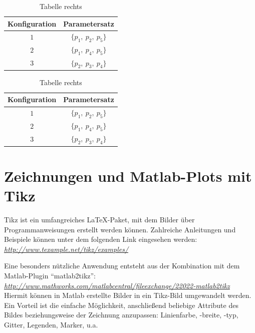 \begin{table}[tb]
\caption{Hauptbeschriftung}
\centering
	\begin{subtable}[t]{.5\textwidth}
	\centering
			\caption{Tabelle links}
			\begin{tabular}{cc}
				\toprule
				Konfiguration & Parametersatz \\
				\midrule
				$1$ & $\{p_{1}, \: p_{2}, \: p_{5}\}$ \\
				$2$ & $\{p_{1}, \: p_{4}, \: p_{5}\}$ \\
				$3$ & $\{p_{2}, \: p_{3}, \: p_{4}\}$ \\
				\bottomrule
			\end{tabular}
			\label{tab:parameter_tabelle1}
	\end{subtable}%
	\begin{subtable}[t]{.5\textwidth}
			\centering
			\caption{Tabelle rechts}
			\begin{tabular}{cc}
				\toprule
				Konfiguration & Parametersatz \\
				\midrule
				$1$ & $\{p_{1}, \: p_{2}, \: p_{5}\}$ \\
				$2$ & $\{p_{1}, \: p_{4}, \: p_{5}\}$ \\
				$3$ & $\{p_{2}, \: p_{3}, \: p_{4}\}$ \\
				\bottomrule
			\end{tabular}
			\label{tab:parameter_tabelle2}
	\end{subtable}
	\label{tab:parameter_tabellen}
\end{table}




%
%
%

\section{Zeichnungen und Matlab-Plots mit Tikz}
\label{sec:tikz}

Tikz ist ein umfangreiches \LaTeX-Paket, mit dem Bilder über Programmanweisungen erstellt werden können.
Zahlreiche Anleitungen und Beispiele können unter dem folgenden Link eingesehen werden:\\ 
\href{http://www.texample.net/tikz/examples/}{\emph{http://www.texample.net/tikz/examples/}}

Eine besonders nützliche Anwendung entsteht aus der Kombination mit dem Matlab-Plugin "`matlab2tikz"':\\
\href{http://www.mathworks.com/matlabcentral/fileexchange/22022-matlab2tikz}{\emph{http://www.mathworks.com/matlabcentral/fileexchange/22022-matlab2tikz}}\\
Hiermit können in Matlab erstellte Bilder in ein Tikz-Bild umgewandelt werden.
Ein Vorteil ist die einfache Möglichkeit, anschließend beliebige Attribute des Bildes beziehungsweise der Zeichnung anzupassen: Linienfarbe, -breite, -typ, Gitter, Legenden, Marker, u.a.

